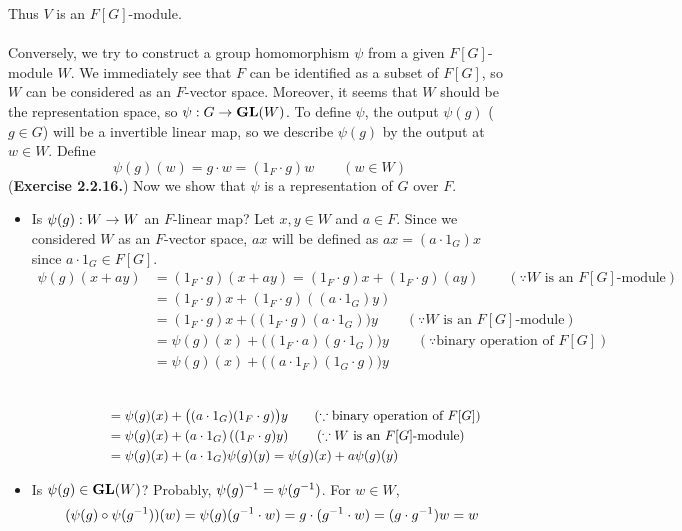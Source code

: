 Thus $V$ is an $F[G]$-module.\\
\\
Conversely, we try to construct a group homomorphism $\psi$ from a given $F[G]$-module $W$. We immediately see that $F$ can be identified as a subset of $F[G]$, so $W$ can be considered as an $F$-vector space. Moreover, it seems that $W$ should be the representation space, so $\psi: G\rightarrow \mathrm{\mathbf{GL}}(W)$. To define $\psi$, the output $\psi(g)$ ($g\in G$) will be a invertible linear map, so we describe $\psi(g)$ by the output at $w\in W$. Define
$$\psi(g)(w) = g\cdot w = (1_F\cdot g)w \qquad (w\in W)$$
({\bfseries \sffamily Exercise 2.2.16.}) Now we show that $\psi$ is a representation of $G$ over $F$.
\begin{itemize}
	\item Is $\psi(g): W\rightarrow W$ an $F$-linear map? Let $x, y\in W$ and $a\in F$. Since we considered $W$ as an $F$-vector space, $ax$ will be defined as $ax = (a\cdot 1_G)x$ since $a\cdot 1_G \in F[G]$.
	$$\begin{aligned}
	\psi(g)(x+ay) &= (1_F\cdot g)(x + ay) = (1_F\cdot g)x + (1_F \cdot g)(ay) \qquad (\because W \text{ is an } F[G]\text{-module})\\
	&=(1_F\cdot g)x + (1_F \cdot g)((a\cdot 1_G)y)\\
	&=(1_F\cdot g)x + \big((1_F\cdot g)(a\cdot 1_G)\big)y\qquad (\because W \text{ is an } F[G]\text{-module})\\
	&=\psi(g)(x) + \big((1_F\cdot a)(g\cdot 1_G)\big)y \qquad (\because \text{binary operation of }F[G])\\
	&=\psi(g)(x) + \big((a\cdot 1_F)(1_G\cdot g)\big)y \\
	\end{aligned}
	$$
	$$\begin{aligned}
	\hphantom{\psi(g)(x+ay)}&\hphantom{= (1_F\cdot g)(x + ay) = (1_F\cdot g)x + (1_F \cdot g)(ay) \qquad (\because W \text{ is an } F[G]\text{-module})}\\
	&= \psi(g)(x) + \big((a\cdot 1_G)(1_F\cdot g)\big)y\qquad (\because \text{binary operation of }F[G])\\
	&= \psi(g)(x) + (a\cdot 1_G)\left((1_F\cdot g)y\right) \qquad (\because W \text{ is an } F[G]\text{-module})\\
	&=\psi(g)(x) + (a\cdot 1_G)\psi(g)(y) = \psi(g)(x) + a\psi(g)(y)
	\end{aligned}
	$$
	\item Is $\psi(g)\in \mathrm{\mathbf{GL}}(W)$? Probably, $\psi(g)^{-1} = \psi(g^{-1})$. For $w\in W$,
	$$(\psi(g)\circ \psi(g^{-1}))(w) = \psi(g)(g^{-1}\cdot w) = g\cdot (g^{-1}\cdot w) = (g\cdot g^{-1})w = w$$

\end{itemize}

